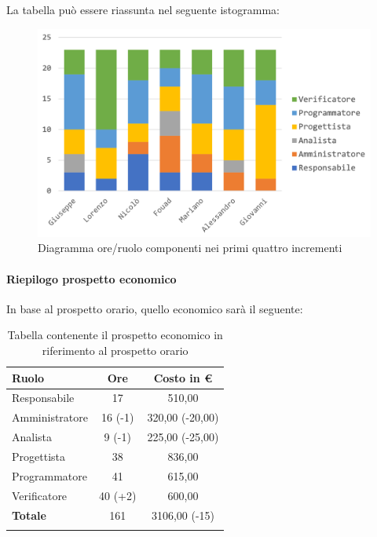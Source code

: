 			La tabella può essere riassunta nel seguente istogramma:
			\begin{figure}[H]
				\centering
				\includegraphics[width=0.8\linewidth]{./images/consuntivo/ConsIncr1-4-1.png}
				\caption{Diagramma ore/ruolo componenti nei primi quattro incrementi}
				\label{fig:diagramma suddivione ruoli incrementi I-IV}
			\end{figure}
			\pagebreak
			
			\paragraph{Riepilogo prospetto economico}
			In base al prospetto orario, quello economico sarà il seguente: 
			
			\begin{longtable}{|l|c|c|}
				\hline
				\rowcolor{lighter-grayer}
				\textbf{Ruolo} & \textbf{Ore} & \textbf{Costo in € } \\
				\hline
				\endfirsthead
				
				\hline
				Responsabile 	    & 17 & 510,00\\
				\hline 
				\hline
				Amministratore	   & 16 (-1) & 320,00 (-20,00)\\
				\hline
				\hline
				Analista 				& 9 (-1)& 225,00 (-25,00)\\
				\hline
				\hline
				Progettista 		   & 38 & 836,00\\
				\hline
				\hline
				Programmatore 	  & 41 & 615,00\\
				\hline
				\hline
				Verificatore 		   & 40 (+2) & 600,00\\
				\hline
				\textbf{Totale} 	 & 161 & 3106,00 (-15)\\
				\hline
				\caption{Tabella contenente il prospetto economico in riferimento al prospetto orario}
			\end{longtable}
			
